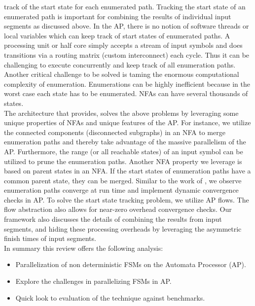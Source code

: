 track of the start state for each enumerated path. Tracking the start
state of an enumerated path is important for combining the results of
individual input segments as discussed above. In the AP, there is no
notion of software threads or local variables which can keep track
of start states of enumerated paths. A processing unit or half core
simply accepts a stream of input symbols and does transitions via
a routing matrix (custom interconnect) each cycle. Thus it can be
challenging to execute concurrently and keep track of all enumeration paths. Another critical challenge to be solved is taming the
enormous computational complexity of enumeration. Enumerations
can be highly inefficient because in the worst case each state has
to be enumerated. NFAs can have several thousands of states.\\
The architecture that \cite{1} provides, solves the above problems by leveraging some unique properties of NFAs and unique features of the AP. For instance, we utilize the connected components (disconnected subgraphs) in an NFA to merge enumeration paths and thereby take
advantage of the massive parallelism of the AP. Furthermore, the
range (or all reachable states) of an input symbol can be utilized to
prune the enumeration paths. Another NFA property we leverage is
based on parent states in an NFA. If the start states of enumeration paths have a common parent state, they can be merged. Similar to
the work of  \cite{2}, we observe enumeration paths converge at run time and implement dynamic convergence checks in AP. To solve the
start state tracking problem, we utilize AP flows. The flow abstraction also allows for near-zero overhead convergence checks. Our
framework also discusses the details of combining the results from
input segments, and hiding these processing overheads by leveraging
the asymmetric finish times of input segments.\\
In summary this review offers the following analysis:
\begin{itemize}
    \item Parallelization of non deterministic FSMs on the Automata Processor (AP).
    \item Explore the challenges in parallelizing FSMs in AP.
    \item Quick look to evaluation of the technique against benchmarks.
    
\end{itemize}

